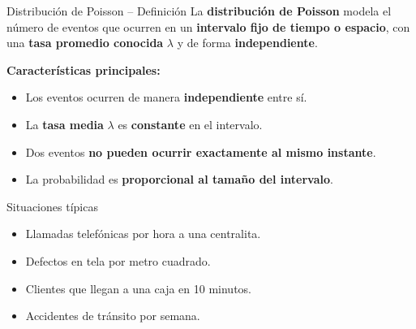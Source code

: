 \documentclass[10pt]{beamer}
\begin{document}

\begin{frame}{Distribución de Poisson -- Definición}
\justifying
La \textbf{distribución de Poisson} modela el número de eventos que ocurren en un \textbf{intervalo fijo de tiempo o espacio}, con una \textbf{tasa promedio conocida} $\lambda$ y de forma \textbf{independiente}.

\vspace{0.3cm}
\textbf{Características principales:}
\begin{itemize}
    \item Los eventos ocurren de manera \textbf{independiente} entre sí.
    \item La \textbf{tasa media} $\lambda$ es \textbf{constante} en el intervalo.
    \item Dos eventos \textbf{no pueden ocurrir exactamente al mismo instante}.
    \item La probabilidad es \textbf{proporcional al tamaño del intervalo}.
\end{itemize}

\vspace{0.2cm}
\begin{exampleblock}{Situaciones típicas}
\begin{itemize}
    \item Llamadas telefónicas por hora a una centralita.
    \item Defectos en tela por metro cuadrado.
    \item Clientes que llegan a una caja en 10 minutos.
    \item Accidentes de tránsito por semana.
\end{itemize}
\end{exampleblock}
\end{frame}
\end{document}
